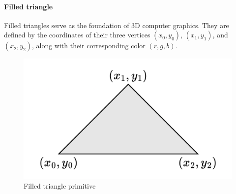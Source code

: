 \paragraph*{Filled triangle}
Filled triangles serve as the foundation of 3D computer graphics. 
They are defined by the coordinates of their three vertices $(x_0,y_0)$, $(x_1,y_1)$, and $(x_2,y_2)$, along with their corresponding color $(r,g,b)$.
\begin{figure}[H]
    \centering
    \includegraphics[width=0.4\linewidth]{images/triangle.png}
    \caption{Filled triangle primitive}
\end{figure}